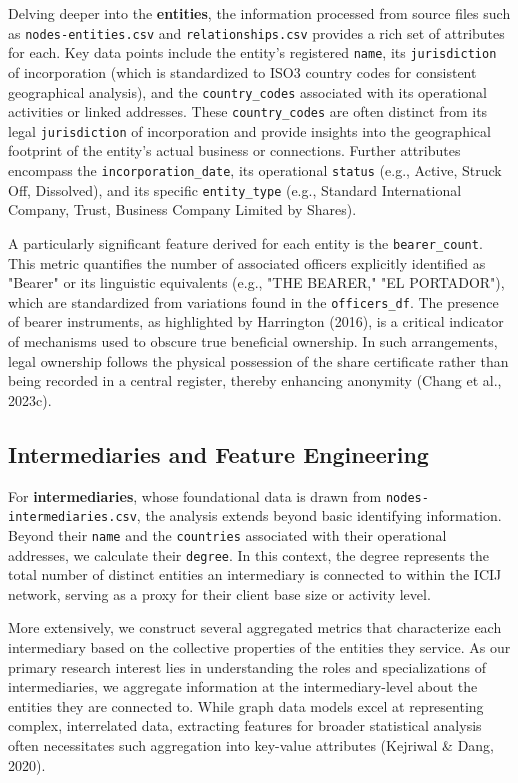 Delving deeper into the \textbf{entities}, the information processed from source files such as \texttt{nodes-entities.csv} and \texttt{relationships.csv} provides a rich set of attributes for each. Key data points include the entity's registered \texttt{name}, its \texttt{jurisdiction} of incorporation (which is standardized to ISO3 country codes for consistent geographical analysis), and the \texttt{country\_codes} associated with its operational activities or linked addresses. These \texttt{country\_codes} are often distinct from its legal \texttt{jurisdiction} of incorporation and provide insights into the geographical footprint of the entity's actual business or connections. Further attributes encompass the \texttt{incorporation\_date}, its operational \texttt{status} (e.g., Active, Struck Off, Dissolved), and its specific \texttt{entity\_type} (e.g., Standard International Company, Trust, Business Company Limited by Shares).

A particularly significant feature derived for each entity is the \texttt{bearer\_count}. This metric quantifies the number of associated officers explicitly identified as "Bearer" or its linguistic equivalents (e.g., "THE BEARER," "EL PORTADOR"), which are standardized from variations found in the \texttt{officers\_df}. The presence of bearer instruments, as highlighted by Harrington (2016), is a critical indicator of mechanisms used to obscure true beneficial ownership. In such arrangements, legal ownership follows the physical possession of the share certificate rather than being recorded in a central register, thereby enhancing anonymity (Chang et al., 2023c).

\subsection{Intermediaries and Feature Engineering}

For \textbf{intermediaries}, whose foundational data is drawn from \texttt{nodes-intermediaries.csv}, the analysis extends beyond basic identifying information. Beyond their \texttt{name} and the \texttt{countries} associated with their operational addresses, we calculate their \texttt{degree}. In this context, the degree represents the total number of distinct entities an intermediary is connected to within the ICIJ network, serving as a proxy for their client base size or activity level.

More extensively, we construct several aggregated metrics that characterize each intermediary based on the collective properties of the entities they service. As our primary research interest lies in understanding the roles and specializations of intermediaries, we aggregate information at the intermediary-level about the entities they are connected to. While graph data models excel at representing complex, interrelated data, extracting features for broader statistical analysis often necessitates such aggregation into key-value attributes (Kejriwal \& Dang, 2020).

